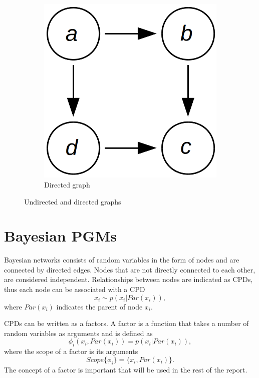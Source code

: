 \documentclass[12pt,oneside,openany,a4paper, %
afrikaans,english,
]{memoir}
\numberwithin{equation}{chapter}
\begin{document}
\begin{figure}[h!]
\begin{subfigure}[b]{0.25\linewidth}
    \includegraphics[width=\linewidth]{Figures/directed_graph.png}
    \caption{Directed graph}
  \end{subfigure}
  \caption{Undirected and directed graphs}
  \label{fig:comGraphs}
\end{figure}
\section{Bayesian PGMs}
Bayesian networks consists of random variables in the form of nodes and are connected by directed edges. Nodes that are not directly connected to each other, are considered independent. Relationships between nodes are indicated as CPDs, thus each node can be associated with a CPD
\begin{equation}
x_i \sim p(x_i|Par(x_i)),
\end{equation}
where $Par(x_i)$ indicates the parent of node $x_i$.

CPDs can be written as a factors. A factor is a function that takes a number of random variables as arguments and is defined as
\begin{equation}
\phi_i(x_i, Par(x_i)) = p(x_i|Par(x_i)),
\end{equation}
where the scope of a factor is its arguments 
\begin{equation}
Scope\{\phi_i\} = \{x_i, Par(x_i)\}.
\end{equation}
The concept of a factor is important that will be used in the rest of the report.
\end{document}
